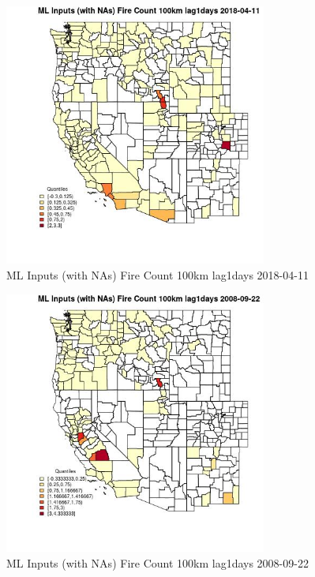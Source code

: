 \begin{figure} 
\centering  
\includegraphics[width=0.77\textwidth]{Code_Outputs/Report_ML_input_PM25_Step4_part_e_de_duplicated_aves_compiled_2019-05-18wNAs_CountyFire_Count_100km_lag1daysMean2018-04-11_2018-04-11.jpg} 
\caption{\label{fig:Report_ML_input_PM25_Step4_part_e_de_duplicated_aves_compiled_2019-05-18wNAsCountyFire_Count_100km_lag1daysMean2018-04-11_2018-04-11}ML Inputs (with NAs) Fire Count 100km lag1days 2018-04-11} 
\end{figure} 
 

\begin{figure} 
\centering  
\includegraphics[width=0.77\textwidth]{Code_Outputs/Report_ML_input_PM25_Step4_part_e_de_duplicated_aves_compiled_2019-05-18wNAs_CountyFire_Count_100km_lag1daysMean2008-09-22_2008-09-22.jpg} 
\caption{\label{fig:Report_ML_input_PM25_Step4_part_e_de_duplicated_aves_compiled_2019-05-18wNAsCountyFire_Count_100km_lag1daysMean2008-09-22_2008-09-22}ML Inputs (with NAs) Fire Count 100km lag1days 2008-09-22} 
\end{figure} 
 

